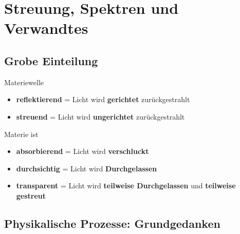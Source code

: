 \documentclass[titlepage,11pt,a4paper,ngerman]{report}
\begin{document}
\section{Streuung, Spektren und Verwandtes}

\subsection{Grobe Einteilung}

Materiewelle
\begin{itemize}
	\item \textbf{reflektierend} = Licht wird \textbf{gerichtet} zurückgestrahlt
	\item \textbf{streuend} = Licht wird \textbf{ungerichtet} zurückgestrahlt
\end{itemize}
Materie ist
\begin{itemize}
	\item \textbf{absorbierend} = Licht wird \textbf{verschluckt}
	\item \textbf{durchsichtig} = Licht wird \textbf{Durchgelassen}
	\item \textbf{transparent} = Licht wird \textbf{teilweise Durchgelassen} und \textbf{teilweise gestreut}
\end{itemize}

\subsection{Physikalische Prozesse: Grundgedanken}
\end{document}

